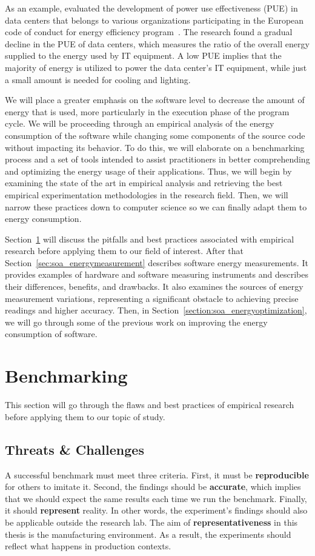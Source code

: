 As an example, \citeauthor{avgerinou_trends_2017} evaluated the development of power use effectiveness (PUE) in data centers that belongs to various organizations participating in the European code of conduct for energy efficiency program~\cite{avgerinou_trends_2017}.
The research found a gradual decline in the PUE of data centers, which measures the ratio of the overall energy supplied to the energy used by IT equipment.
A low PUE implies that the majority of energy is utilized to power the data center's IT equipment, while just a small amount is needed for cooling and lighting.

We will place a greater emphasis on the software level to decrease the amount of energy that is used, more particularly in the execution phase of the program cycle.
We will be proceeding through an empirical analysis of the energy consumption of the software while changing some components of the source code without impacting its behavior.
To do this, we will elaborate on a benchmarking process and a set of tools intended to assist practitioners in better comprehending and optimizing the energy usage of their applications.
Thus, we will begin by examining the state of the art in empirical analysis and retrieving the best empirical experimentation methodologies in the research field. Then, we will narrow these practices down to computer science so we can finally adapt them to energy consumption.

Section~\ref{sec:soa_benchmarking} will discuss the pitfalls and best practices associated with empirical research before applying them to our field of interest.
After that Section~\ref{sec:soa_energymeasurement} describes software energy measurements.
It provides examples of hardware and software measuring instruments and describes their differences, benefits, and drawbacks. It also examines the sources of energy measurement variations, representing a significant obstacle to achieving precise readings and higher accuracy.
Then, in Section~\ref{section:soa_energyoptimization}, we will go through some of the previous work on improving the energy consumption of software.

\clearpage
\section{Benchmarking}\label{sec:soa_benchmarking}
This section will go through the flaws and best practices of empirical research before applying them to our topic of study.

\subsection{Threats \& Challenges}
A successful benchmark must meet three criteria.
First, it must be \textbf{reproducible} for others to imitate it.
Second, the findings should be \textbf{accurate}, which implies that we should expect the same results each time we run the benchmark.
Finally, it should \textbf{represent} reality.
In other words, the experiment's findings should also be applicable outside the research lab.
The aim of \textbf{representativeness} in this thesis is the manufacturing environment.
As a result, the experiments should reflect what happens in production contexts.


